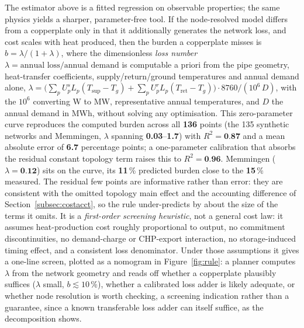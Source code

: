 \documentclass[a4paper,fleqn]{cas-sc}
\begin{document}
The estimator above is a fitted regression on observable properties; the same physics yields a
sharper, parameter-free tool. If the node-resolved model differs from a copperplate only in that
it additionally generates the network loss, and cost scales with heat produced, then the burden a
copperplate misses is $b=\lambda/(1+\lambda)$, where the dimensionless \emph{loss number}
$\lambda=\text{annual loss}/\text{annual demand}$ is computable a priori from the pipe geometry, heat-transfer coefficients, supply/return/ground temperatures and annual demand
alone, $\lambda=\big(\sum_p U^{s}_p L_p (T_{\text{sup}}-T_g)+\sum_p U^{r}_p L_p
(T_{\text{ret}}-T_g)\big)\cdot 8760/(10^{6}\,D)$, with the $10^{6}$ converting W to MW,
representative annual temperatures, and $D$ the annual demand in MWh, without solving any
optimisation. This
zero-parameter curve reproduces the computed burden across all \textbf{136} points (the
135 synthetic networks and Memmingen, $\lambda$ spanning
\textbf{0.03}--\textbf{1.7}) with $R^2=\textbf{0.87}$ and a mean
absolute error of \textbf{6.7} percentage points; a one-parameter calibration that
absorbs the residual constant topology term raises this to $R^2=\textbf{0.96}$. Memmingen
($\lambda=\textbf{0.12}$) sits on the curve, its \textbf{11}\,\% predicted
burden close to the \textbf{15}\,\% measured. The residual few points are
informative rather than error: they are consistent with the omitted topology main effect and the
accounting difference of Section~\ref{subsec:costacct}, so the rule under-predicts by about the
size of the terms it omits. It is a \emph{first-order screening heuristic}, not a general cost
law: it assumes heat-production cost roughly proportional to output, no commitment
discontinuities, no demand-charge or CHP-export interaction, no storage-induced timing effect,
and a consistent loss denominator. Under those assumptions it gives a one-line screen, plotted
as a nomogram in Figure~\ref{fig:rule}: a planner computes $\lambda$ from the network geometry
and reads off whether a copperplate plausibly suffices ($\lambda$ small, $b\lesssim10$\,\%),
whether a calibrated loss adder is likely adequate, or whether node resolution is worth
checking, a screening indication rather than a guarantee, since a known transferable loss
adder can itself suffice, as the decomposition shows.

\end{document}
